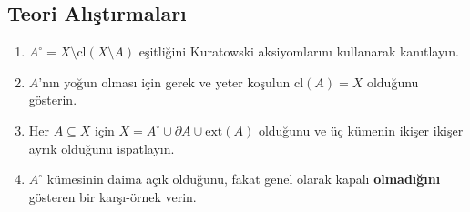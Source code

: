 \subsection*{Teori Alıştırmaları}
\begin{enumerate}[label=\textbf{T\arabic*.}]
  \item $A^\circ = X \setminus \mathrm{cl}(X \setminus A)$ eşitliğini Kuratowski
        aksiyomlarını kullanarak kanıtlayın.
  \item $A$'nın yoğun olması için gerek ve yeter koşulun $\mathrm{cl}(A) = X$ olduğunu
        gösterin.
  \item Her $A \subseteq X$ için $X = A^\circ \cup \partial A \cup \mathrm{ext}(A)$
        olduğunu ve üç kümenin ikişer ikişer ayrık olduğunu ispatlayın.
  \item $A^\circ$ kümesinin daima açık olduğunu, fakat genel olarak kapalı
        \textbf{olmadığını} gösteren bir karşı-örnek verin. 
\end{enumerate}
